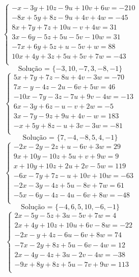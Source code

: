 \documentclass[12pt,oneside,a4paper]{article}
\begin{document}
\vspace{\baselineskip}
\begin{equation*}
\begin{cases}
-x-3y+10z-9u+10v+6w=-210 \\
-8x+5y+8z-9u+4v+4w=-45 \\
8x+7y+7z+10u-v+4w=31 \\
3x-6y-5z+5u-5v-10w=31 \\
-7x+6y+5z+u-5v+w=88 \\
10x+4y+3z+5u+5v+7w=-43 \\
\end{cases}
\end{equation*}
\begin{equation*}
\text{Solução = }\{-3,10,-7,3,-8,-1\}
\end{equation*}
\vspace{\baselineskip}
\begin{equation*}
\begin{cases}
5x+7y+7z-8u+4v-3w=-70 \\
7x-y-4z-2u-6v+5w=46 \\
-10x-7y-3z-7u+9v-4w=-13 \\
6x-3y+6z-u-v+2w=-5 \\
3x-7y-9z+9u+4v-w=183 \\
-x+5y+8z-u+3v-3w=-81 \\
\end{cases}
\end{equation*}
\begin{equation*}
\text{Solução = }\{7,-4,-8,5,4,-1\}
\end{equation*}
\vspace{\baselineskip}
\begin{equation*}
\begin{cases}
-2x-2y-2z+u-6v+3w=29 \\
9x+10y-10z+5u+v+9w=9 \\
x+10y+10z+2u+2v-5w=119 \\
-6x-7y+7z-u+10v+10w=-63 \\
-2x-3y-4z+5u-8v+7w=61 \\
-5x-6y-4z-4u-6v+8w=-48 \\
\end{cases}
\end{equation*}
\begin{equation*}
\text{Solução = }\{-4,6,5,10,-6,-1\}
\end{equation*}
\vspace{\baselineskip}
\begin{equation*}
\begin{cases}
2x-5y-5z+3u-5v+7w=4 \\
2x+4y+10z+10u+6v-8w=-22 \\
-2x-y+4z-6u-6v+8w=74 \\
-7x-2y+8z+5u-6v-4w=12 \\
2x-4y-4z+3u-2v-4w=-38 \\
-9x+8y+8z+5u-7v+9w=113 \\
\end{cases}
\end{equation*}
\end{document}
